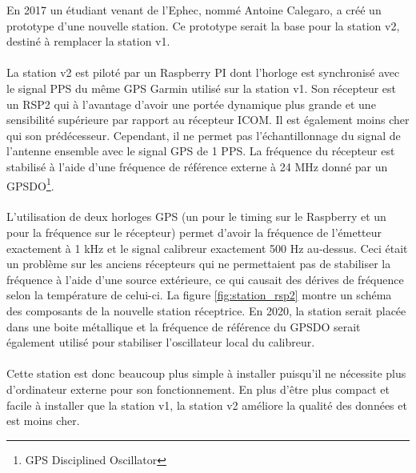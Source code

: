 \documentclass[11pt]{article}
\begin{document}
En 2017 un étudiant venant de l'Ephec, nommé Antoine Calegaro, a créé un prototype d'une nouvelle station.
Ce prototype serait la base pour la station v2, destiné à remplacer la station v1.\\
\\
La station v2 est piloté par un Raspberry PI dont l'horloge est synchronisé avec le signal PPS du même GPS Garmin utilisé sur la station v1.
Son récepteur est un RSP2 qui à l'avantage d'avoir une portée dynamique plus grande et une sensibilité supérieure par rapport au récepteur ICOM.
Il est également moins cher qui son prédécesseur.
Cependant, il ne permet pas l'échantillonnage du signal de l'antenne ensemble avec le signal GPS de 1 PPS.
La fréquence du récepteur est stabilisé à l'aide d'une fréquence de référence externe à 24 MHz donné par un GPSDO\footnote{GPS Disciplined Oscillator}.\\
\\
L'utilisation de deux horloges GPS (un pour le timing sur le Raspberry et un pour la fréquence sur le récepteur) permet d'avoir la fréquence de l'émetteur exactement à 1 kHz et le signal calibreur exactement 500 Hz au-dessus.
Ceci était un problème sur les anciens récepteurs qui ne permettaient pas de stabiliser la fréquence à l'aide d'une source extérieure, ce qui causait des dérives de fréquence selon la température de celui-ci.
La figure \ref{fig:station_rsp2} montre un schéma des composants de la nouvelle station réceptrice.
En 2020, la station serait placée dans une boite métallique et la fréquence de référence du GPSDO serait également utilisé pour stabiliser l'oscillateur local du calibreur.\\
\\
Cette station est donc beaucoup plus simple à installer puisqu'il ne nécessite plus d'ordinateur externe pour son fonctionnement.
En plus d'être plus compact et facile à installer que la station v1, la station v2 améliore la qualité des données et est moins cher.


\end{document}
